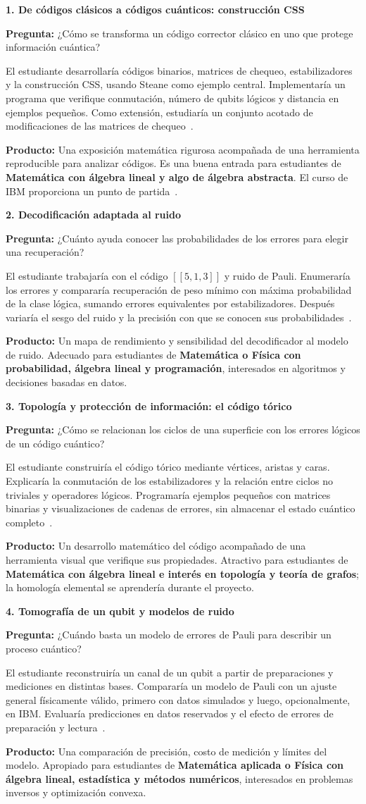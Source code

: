 \documentclass[11pt,a4paper]{article}
\newcommand{\tema}[5]{%
\noindent\begin{minipage}{\linewidth}\raggedright
\textbf{#1. #2}\par
\textbf{Pregunta:} #3\par
#4\par
\textbf{Producto:} #5
\end{minipage}\par\vspace{9pt}}
\begin{document}
\raggedright

\tema{1}{De códigos clásicos a códigos cuánticos: construcción CSS}
{¿Cómo se transforma un código corrector clásico en uno que protege información cuántica?}
{El estudiante desarrollaría códigos binarios, matrices de chequeo, estabilizadores y la construcción CSS, usando Steane como ejemplo central. Implementaría un programa que verifique conmutación, número de qubits lógicos y distancia en ejemplos pequeños. Como extensión, estudiaría un conjunto acotado de modificaciones de las matrices de chequeo~\cite{css}.}
{Una exposición matemática rigurosa acompañada de una herramienta reproducible para analizar códigos. Es una buena entrada para estudiantes de \textbf{Matemática con álgebra lineal y algo de álgebra abstracta}. El curso de IBM proporciona un punto de partida~\cite{ibmqec}.}

\tema{2}{Decodificación adaptada al ruido}
{¿Cuánto ayuda conocer las probabilidades de los errores para elegir una recuperación?}
{El estudiante trabajaría con el código $[[5,1,3]]$ y ruido de Pauli. Enumeraría los errores y compararía recuperación de peso mínimo con máxima probabilidad de la clase lógica, sumando errores equivalentes por estabilizadores. Después variaría el sesgo del ruido y la precisión con que se conocen sus probabilidades~\cite{adapted}.}
{Un mapa de rendimiento y sensibilidad del decodificador al modelo de ruido. Adecuado para estudiantes de \textbf{Matemática o Física con probabilidad, álgebra lineal y programación}, interesados en algoritmos y decisiones basadas en datos.}

\tema{3}{Topología y protección de información: el código tórico}
{¿Cómo se relacionan los ciclos de una superficie con los errores lógicos de un código cuántico?}
{El estudiante construiría el código tórico mediante vértices, aristas y caras. Explicaría la conmutación de los estabilizadores y la relación entre ciclos no triviales y operadores lógicos. Programaría ejemplos pequeños con matrices binarias y visualizaciones de cadenas de errores, sin almacenar el estado cuántico completo~\cite{toric}.}
{Un desarrollo matemático del código acompañado de una herramienta visual que verifique sus propiedades. Atractivo para estudiantes de \textbf{Matemática con álgebra lineal e interés en topología y teoría de grafos}; la homología elemental se aprendería durante el proyecto.}

\tema{4}{Tomografía de un qubit y modelos de ruido}
{¿Cuándo basta un modelo de errores de Pauli para describir un proceso cuántico?}
{El estudiante reconstruiría un canal de un qubit a partir de preparaciones y mediciones en distintas bases. Compararía un modelo de Pauli con un ajuste general físicamente válido, primero con datos simulados y luego, opcionalmente, en IBM. Evaluaría predicciones en datos reservados y el efecto de errores de preparación y lectura~\cite{tomography}.}
{Una comparación de precisión, costo de medición y límites del modelo. Apropiado para estudiantes de \textbf{Matemática aplicada o Física con álgebra lineal, estadística y métodos numéricos}, interesados en problemas inversos y optimización convexa.}
\end{document}
